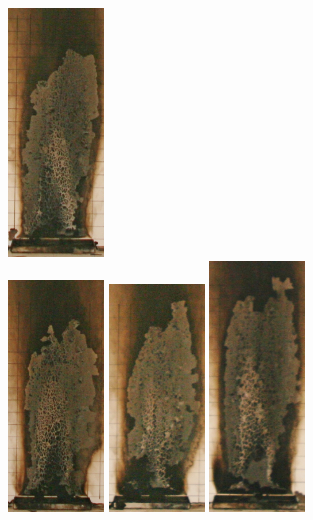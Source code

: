 \documentclass[twoside]{uocthesis}
\begin{document}
\begin{figure}[p]
	\includegraphics[width=1.0in]{../Figures/GBGAS_08_IMG_5698} \\

	\includegraphics[width=1.0in]{../Figures/GBGAS_09_IMG_5717}
	\includegraphics[width=1.0in]{../Figures/GBGAS_10_IMG_5737}
	\includegraphics[width=1.0in]{../Figures/GBGAS_11_IMG_5756}

\end{figure}
\end{document}
